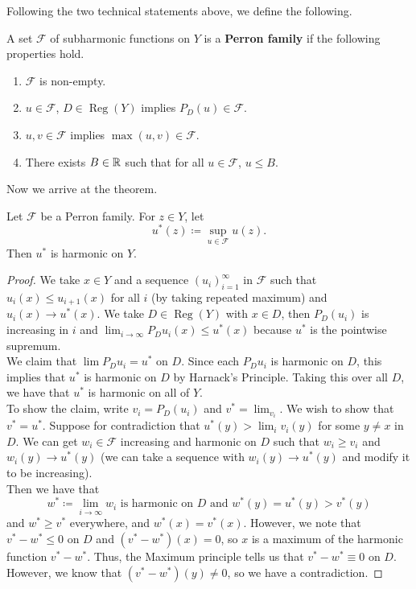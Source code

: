 \documentclass{article}
\begin{document}
{Following the two technical statements above, we define the following.

\begin{definition}
    A set $\mathcal{F}$ of subharmonic functions on $Y$ is a \textbf{Perron family} if the following properties hold.
    \begin{enumerate}
        \item $\mathcal{F}$ is non-empty.
        \item $u \in \mathcal{F}$, $D \in \operatorname{Reg}(Y)$ implies $P_D(u) \in \mathcal{F}$.
        \item $u, v \in \mathcal{F}$ implies $\max(u, v) \in \mathcal{F}$.
        \item There exists $B \in \mathbb{R}$ such that for all $u \in \mathcal{F}$, $u \leq B$.
    \end{enumerate}
\end{definition}

Now we arrive at the theorem.
\begin{theorem}
Let $\mathcal{F}$ be a Perron family. For $z \in Y$, let
\[u^*(z) \coloneqq \sup_{u \in \mathcal{F}} u(z).\]
Then $u^*$ is harmonic on $Y$.
\end{theorem}

\begin{proof}
    We take $x \in Y$ and a sequence $(u_i)_{i = 1}^\infty$ in $\mathcal{F}$ such that $u_i(x) \leq u_{i+1}(x)$ for all $i$ (by taking repeated maximum) and $u_i(x) \to u^*(x)$. We take $D \in \operatorname{Reg}(Y)$ with $x \in D$, then $P_D(u_i)$ is increasing in $i$ and $\lim_{i \to \infty} P_D u_i(x) \leq u^*(x)$ because $u^*$ is the pointwise supremum.\\
    
    We claim that $\lim P_D u_i = u^*$ on $D$. Since each $P_D u_i$ is harmonic on $D$, this implies that $u^*$ is harmonic on $D$ by Harnack's Principle. Taking this over all $D$, we have that $u^*$ is harmonic on all of $Y$.\\
    
    To show the claim, write $v_i = P_D (u_i)$ and $v^* = \lim_{v_i}$. We wish to show that $v^* = u^*$. Suppose for contradiction that $u^*(y) > \lim_{i} v_i(y)$ for some $y \neq x$ in $D$. We can get $w_i \in \mathcal{F}$ increasing and harmonic on $D$ such that $w_i \geq v_i$ and $w_i(y) \to u^*(y)$ (we can take a sequence with $w_i(y) \to u^*(y)$ and modify it to be increasing).\\
    
    Then we have that
    \[w^* \coloneqq \lim_{i \to \infty} w_i \text{ is harmonic on $D$ and } w^*(y) = u^*(y) > v^*(y)\]
    and $w^* \geq v^*$ everywhere, and $w^*(x) = v^*(x)$. However, we note that $v^* - w^* \leq 0$ on $D$ and $(v^* - w^*)(x) = 0$, so $x$ is a maximum of the harmonic function $v^* - w^*$. Thus, the Maximum principle tells us that $v^* - w^* \equiv 0$ on $D$. However, we know that $(v^* - w^*)(y) \neq 0$, so we have a contradiction.
\end{proof}

}
\end{document}

